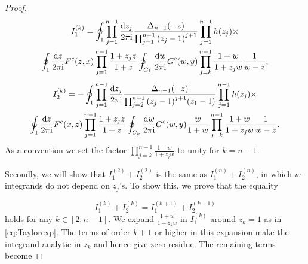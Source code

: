 \documentclass[cmp]{svjour}
\numberwithin{theorem}{section}
\numberwithin{equation}{section}
\def\dd{{\rm d}}
\def\ii{{\rm i}}
\def\be{\begin{equation}}
\def\ee{\end{equation}}
\begin{document}
\begin{proof}
\begin{multline*}
\label{def:I1k}
I_1^{(k)} =   \oint_{1} \prod_{j=1}^{n-1}{ \frac{\dd z_j}{2 \pi \ii} } \frac{ \Delta_{n-1}(-z)}{ \prod_{j=1}^{n-1}{{(z_j -1)}^{j+1}} } \prod_{j=1}^{n-1}{h(z_j)} \times \\
 \oint_{1} \frac{\dd z}{2 \pi \ii} F^c(z , x) \prod_{j=1}^{n-1}{ \frac{1 + z_j z}{1 + z} } \oint_{C_{k}} \frac{\dd w}{2 \pi \ii} G^c(w , y)  \prod_{j=k}^{n-1}{\frac{1 + w}{1 + z_j w}}  \frac{1}{w-z}, 
\end{multline*}
%
\begin{multline*}
I_2^{(k)} =   - \oint_{1} \prod_{j=1}^{n-1}{ \frac{\dd z_j}{2 \pi \ii} } \frac{ \Delta_{n-1}(-z) }{ \prod_{j=2}^{n-1}{{(z_j -1)}^{j+1}} (z_1-1) } \prod_{j=1}^{n-1}{h(z_j)} \times \\
 \oint_{1} \frac{\dd z}{2 \pi \ii} F^c(x, z) \prod_{j=1}^{n-1}{ \frac{1 + z_j z}{1 + z} } \oint_{C_{k}} \frac{\dd w}{2 \pi \ii} G^c(w, y)  \frac{w}{1+w}  \prod_{j=k}^{n-1}{\frac{1 + w}{1 + z_j w}}  \frac{1}{w-z} .
\end{multline*}
As a convention   we set the factor $\prod_{j=k}^{n-1} \frac{1+w}{1+z_j w}$ to unity for $k=n-1$.


Secondly, we will show that $I_1^{(2)} + I_2^{(2)}$ is the same as $I_1^{(n)}+I_2^{(n)}$, in which $w$-integrands do not depend on $z_j$'s.
To show this, we prove that the equality


\be
\label{eq:rank1lem1_3}
I_1^{(k)} + I_2^{(k)} = I_1^{(k+1)} + I_2^{(k+1)}
\ee
holds for any $k \in [2,n-1]$. We expand $\frac{1 + w}{1 + z_{k} w}$ in $I_1^{(k)}$ around $z_{k}=1$ as in \eqref{eq:Taylorexp}.  The terms of order $k+1$ or higher in this expansion make the integrand analytic in $z_{k}$ and hence give zero residue. The remaining terms become


\end{proof}
\end{document}
